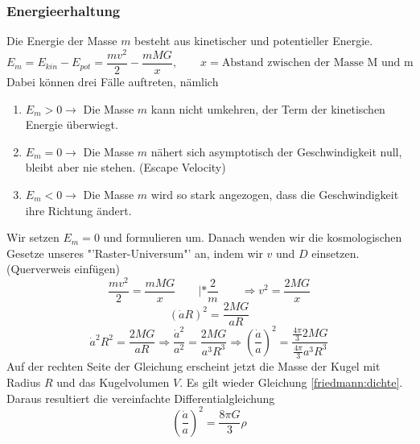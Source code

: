 \begin{refsection}
\subsubsection{Energieerhaltung}
Die Energie der Masse $m$ besteht aus kinetischer und potentieller Energie.
\begin{equation}
E_m = E_{kin} - E_{pot} =  \frac{m v^2}{2} - \frac{m M G }{x}, \qquad x = \text{Abstand zwischen der Masse M und m}
\end{equation}
Dabei können drei Fälle auftreten, nämlich
\begin{enumerate}
	\item $E_m > 0 \rightarrow$ Die Masse $m$ kann nicht umkehren, der Term der kinetischen Energie überwiegt.
	\item $E_m = 0 \rightarrow$ Die Masse $m$ nähert sich asymptotisch  der Geschwindigkeit null, bleibt aber nie stehen. (Escape Velocity)
	\item $E_m < 0 \rightarrow$ Die Masse $m$ wird so stark angezogen, dass die Geschwindigkeit ihre Richtung ändert.
\end{enumerate}
Wir setzen $E_m = 0$ und formulieren um. Danach wenden wir die kosmologischen Gesetze unseres "'Raster-Universum"' an, indem wir $v$ und $D$ einsetzen. (Querverweis einfügen)
\[\frac{m v^2}{2} = \frac{m M G}{x} \qquad| *\frac{2}{m} \qquad \Rightarrow {v^2} = \frac{2 M G}{x}\]
\[\left( \dot{a} R\right)^2 = \frac{2 M G}{a R}\] 
\[\dot{a}^2 R^2= \frac{2 M G}{a R} \Rightarrow \frac{\dot{a}^2}{a^2} = \frac{2 M G}{a^3 R^3} \Rightarrow \left(\frac{\dot{a}}{a} \right)^2 = \frac{\frac{4 \pi}{3}2 M G}{\frac{4 \pi}{3} a^3 R^3} \] %
Auf der rechten Seite der Gleichung erscheint jetzt die Masse der Kugel mit Radius $R$ und das Kugelvolumen $V$. Es gilt wieder Gleichung \ref{friedmann:dichte}. Daraus resultiert die vereinfachte Differentialgleichung 
\begin{equation}
\left(\frac{\dot{a}}{a} \right)^2 = \frac{8 \pi G}{3} \rho
\end{equation}
\end{refsection}

